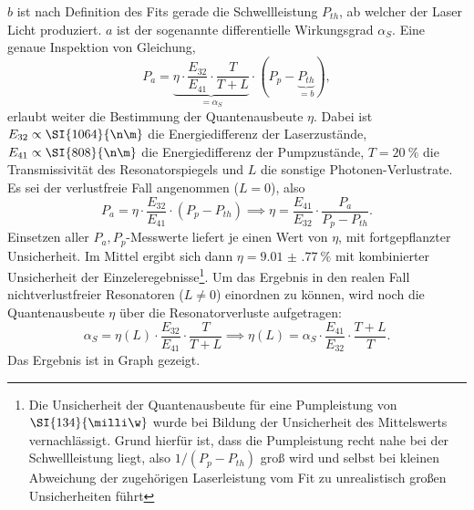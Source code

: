 \documentclass[../../../main.tex]{subfiles}
\begin{document}
    $b$ ist nach Definition des Fits gerade die Schwellleistung $P_{th}$, ab welcher der Laser Licht produziert. $a$ ist der sogenannte differentielle Wirkungsgrad $\alpha_S$. Eine genaue Inspektion von Gleichung,
    \[
        P_a = \underbrace{\eta\cdot\frac{E_{32}}{E_{41}}\cdot \frac{T}{T + L}}_{=\alpha_S}\cdot(P_p - \underbrace{P_{th}}_{=b}),
    \]
    erlaubt weiter die Bestimmung der Quantenausbeute $\eta$. Dabei ist $E_{32} \propto \SI{1064}{\n\m}$ die Energiedifferenz der Laserzustände, $E_{41} \propto \SI{808}{\n\m}$ die Energiedifferenz der Pumpzustände, $T=\SI{20}{\percent}$ die Transmissivität des Resonatorspiegels und $L$ die sonstige Photonen-Verlustrate. Es sei der verlustfreie Fall angenommen ($L=0$), also 
    \[
        P_a = \eta\cdot\frac{E_{32}}{E_{41}}\cdot(P_p - P_{th}) \implies \eta = \frac{E_{41}}{E_{32}}\cdot \frac{P_a}{P_p - P_{th}}.
    \] 
    Einsetzen aller $P_a, P_p$-Messwerte liefert je einen Wert von $\eta$, mit fortgepflanzter Unsicherheit. Im Mittel ergibt sich dann $\eta = \SI{9.01(77)}{\percent}$ mit kombinierter Unsicherheit der Einzeleregebnisse\footnote{Die Unsicherheit der Quantenausbeute für eine Pumpleistung von $\SI{134}{\milli\w}$ wurde bei Bildung der Unsicherheit des Mittelswerts vernachlässigt. Grund hierfür ist, dass die Pumpleistung recht nahe bei der Schwellleistung liegt, also $1/ (P_p - P_{th})$ groß wird und selbst bei kleinen Abweichung der zugehörigen Laserleistung vom Fit zu unrealistisch großen Unsicherheiten führt}. Um das Ergebnis in den realen Fall nichtverlustfreier Resonatoren ($L\neq 0$) einordnen zu können, wird noch die Quantenausbeute $\eta$ über die Resonatorverluste aufgetragen:
    \[
        \alpha_S = \eta(L)\cdot\frac{E_{32}}{E_{41}}\cdot\frac{T}{T + L}\implies \eta(L) = \alpha_S\cdot\frac{E_{41}}{E_{32}}\cdot\frac{T + L}{T}.
    \]
    Das Ergebnis ist in Graph gezeigt.
\end{document}
